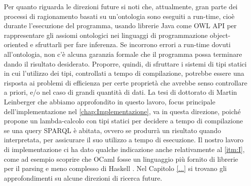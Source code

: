 Per quanto riguarda le direzioni future si noti che, attualmente, gran parte dei processi di ragionamento basati su un'ontologia sono eseguiti a run-time, cioè durante l'esecuzione del programma, usando librerie Java come OWL API \cite{OWLAPI} per rappresentare gli assiomi ontologici nei linguaggi di programmazione object-oriented e sfruttarli per fare inferenza. Se incorrono errori a run-time dovuti all'ontologia, non c'è alcuna garanzia formale che il programma possa terminare dando il risultato desiderato. Proporre, quindi, di sfruttare i sistemi di tipi statici in cui l'utilizzo dei tipi, controllati a tempo di compilazione, potrebbe essere una risposta ai problemi di efficienza per certe proprietà che avrebbe senso controllare a priori, e/o nel caso di grandi quantità di dati. La tesi di dottorato di Martin Leinberger \cite{leinbergerphdthesis} che abbiamo approfondito in questo lavoro, focus principale dell'implementazione nel \autoref{chap:Implementazione}, va in questa direzione, poiché propone un lambda-calcolo con tipi statici per decidere a tempo di compilazione se una query SPARQL è abitata, ovvero se produrrà un risultato quando interpretata, per assicurare il suo utilizzo a tempo di esecuzione. Il nostro lavoro di implementazione ci ha dato qualche indicazione anche relativamente al \autoref{itm:I}, come ad esempio scoprire che OCaml \cite{...} fosse un linguaggio più fornito di librerie per il parsing e meno complesso di Haskell \cite{...}. Nel Capitolo \ref{...} si trovano gli approfondimenti su alcune direzioni di ricerca future.

